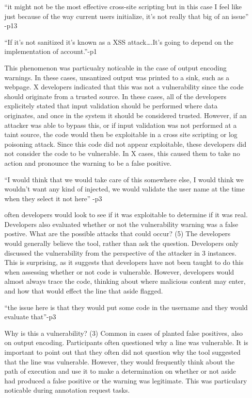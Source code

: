 \documentclass[twoside,letterpaper]{soups}
\begin{document}
“it might not be the most effective cross-site scripting but in this case I feel like just because of the way current users initialize, it's not really that big of an issue” -p13

“If it's not sanitized it's known as a XSS attack….It's going to depend on the implementation of account.”-p1


This phenomenon was particualry noticable in the case of output encoding warnings. In these cases, unsantized output was printed to a sink, such as a webpage. X developers indicated that this was not a vulnerability since the code should originate from a trusted source. In these cases, all of the developers explicitely stated that input validation should be performed where data originates, and once in the system it should be considered trusted. However, if an attacker was able to bypass this, or if input validation was not performed at a taint source, the code would then be exploitable in a cross site scripting or log poisoning attack. Since this code did not appear exploitable, these developers did not consider the code to be vulnerable. In X cases, this caused them to take no action and pronounce the warning to be a false positive. 

“I would think that we would take care of this somewhere else, I would think we wouldn’t want any kind of injected, we would validate the user name at the time when they select it not here” -p3


often developers would look to see if it was exploitable to determine if it was real. Developers also evaluated whether or not the vulnerability warning was a false postive. 
What are the possible attacks that could occur? (5)	The developers would generally believe the tool, rather than ask the question. Developers only discussed the vulnerability from the perspective of the attacker in 3 instances. This is surprising, as it suggests that developers have not been taught to do this when assessing whether or not code is vulnerable. However, developers would almost always trace the code, thinking about where malicious content may enter, and how that would effect the line that aside flagged.

“the issue here is that they would put some code in the username and they would evaluate that”-p3

Why is this a vulnerability? (3)	Common in cases of planted false positives, also on output encoding. Participants often questioned why a line was vulnerable. It is important to point out that they often did not question why the tool suggested that the line was vulnerable. However, they would frequently think about the path of execution and use it to make a determination on whether or not aside had produced a false positive or the warning was legitimate. This was particulary noticable during annotation request tasks.
\end{document}
